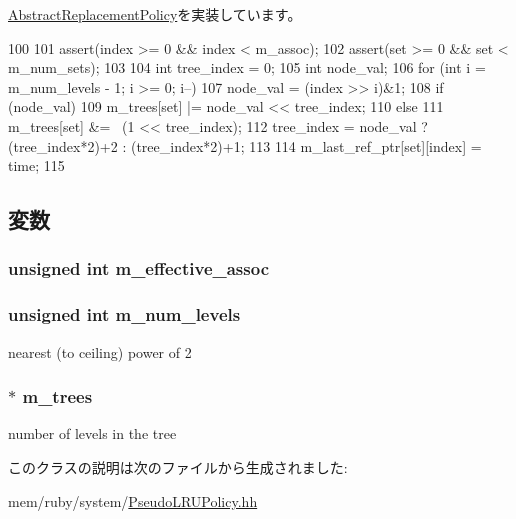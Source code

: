 \hyperlink{classAbstractReplacementPolicy_a6354174153ace07b8cef20f36b20357a}{AbstractReplacementPolicy}を実装しています。


\begin{DoxyCode}
100 {
101     assert(index >= 0 && index < m_assoc);
102     assert(set >= 0 && set < m_num_sets);
103 
104     int tree_index = 0;
105     int node_val;
106     for (int i = m_num_levels - 1; i >= 0; i--) {
107         node_val = (index >> i)&1;
108         if (node_val)
109             m_trees[set] |= node_val << tree_index;
110         else
111             m_trees[set] &= ~(1 << tree_index);
112         tree_index = node_val ? (tree_index*2)+2 : (tree_index*2)+1;
113     }
114     m_last_ref_ptr[set][index] = time;
115 }
\end{DoxyCode}


\subsection{変数}
\hypertarget{classPseudoLRUPolicy_a7715ac656545d5c327a5bbe21e48e4c1}{
\subsubsection[{m\_\-effective\_\-assoc}]{\setlength{\rightskip}{0pt plus 5cm}unsigned int {\bf m\_\-effective\_\-assoc}}}
\label{classPseudoLRUPolicy_a7715ac656545d5c327a5bbe21e48e4c1}
\hypertarget{classPseudoLRUPolicy_a27b35e9f12570ea06bb2a060bba1ff6b}{
\subsubsection[{m\_\-num\_\-levels}]{\setlength{\rightskip}{0pt plus 5cm}unsigned int {\bf m\_\-num\_\-levels}}}
\label{classPseudoLRUPolicy_a27b35e9f12570ea06bb2a060bba1ff6b}
nearest (to ceiling) power of 2 \hypertarget{classPseudoLRUPolicy_ac97202b70d0180f4854d13627ce86978}{
\subsubsection[{m\_\-trees}]{$\ast$ {\bf m\_\-trees}}}
\label{classPseudoLRUPolicy_ac97202b70d0180f4854d13627ce86978}
number of levels in the tree 

このクラスの説明は次のファイルから生成されました:\begin{DoxyCompactItemize}
\item 
mem/ruby/system/\hyperlink{PseudoLRUPolicy_8hh}{PseudoLRUPolicy.hh}\end{DoxyCompactItemize}
